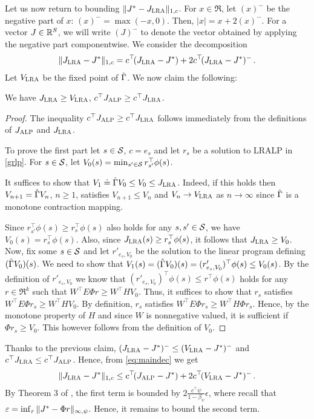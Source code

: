 \documentclass[twocolumn]{IEEEtran}
\begin{document}
Let us now return to bounding $\norm{J^*-\Jlr}_{1,c}$.
For $x\in \Re$, let $(x)^-$ be the negative part of $x$: $(x)^- = \max(-x,0)$. Then, $|x| = x + 2 (x)^-$. For a vector $J\in \R^S$,
we will write $(J)^-$ to denote the vector obtained by applying the negative part componentwise.
We consider the decomposition
\begin{align}
\label{eq:maindec}
\norm{\Jlr-J^*}_{1,c} = c^\top\!( \Jlr - J^* ) + 2c^\top\!( \Jlr - J^* )^-\,.
\end{align}
Let $\hv$ be the fixed point of $\hg$. We now claim the following:
\begin{claim}
We have $\Jlr \ge \hv$, $c^\top \Jalp \ge c^\top \Jlr$.
\end{claim}
\begin{proof}
The inequality $c^\top \Jalp \ge c^\top \Jlr$  follows immediately from the definitions of $\Jalp$ and $\Jlr$.

To prove the first part let $s\in \S$,  $c=e_s$ and let $r_s$ be a solution to LRALP in \eqref{grlp}.
For $s\in \S$, let $V_0(s)= \min_{s'\in \S} r_{s'}^\top \phi(s)$.

It suffices to show that $V_1\eqdef \hg V_0 \le V_0 \le \hj$.
Indeed, if this holds then
$V_{n+1} = \hg V_n$, $n\ge 1$, satisfies $V_{n+1}\le V_n$ and $V_n \to \hv$ as $n\to\infty$
since $\hg$ is a monotone contraction mapping.


Since  $r_{s'}^\top \phi(s) \ge r_s^\top \phi(s)$ %
also holds for any $s,s'\in \S$,
we have $V_0(s)  = r_s^\top \phi(s)$. %
Also, since $\hj(s) \ge r_s^\top \phi(s)$, %
it follows that $\hj\geq V_0$.
Now,  fix some $s\in \S$ and
let $r'_{e_s,V_0}$ be the solution to the linear program defining $(\hg V_0)(s)$.
We need to show that $V_1(s)=(\hg V_0)(s) = ( r'_{e_s,V_0})^\top \phi(s) \leq V_0(s)$.
By the definition of $r'_{e_s,V_0}$ we know that $( r'_{e_s,V_0})^\top \phi(s) \le r^\top \phi(s)$ %
holds for any $r\in \Re^k$ such that $W^\top E \Phi r \ge W^\top H V_0$.
Thus, it suffices to show that $r_s$ satisfies $W^\top E \Phi r_s \ge W^\top H V_0$.
By definition, $r_s$ satisfies $W^\top E \Phi r_s \ge W^\top H \Phi r_s$.
Hence, by the monotone property of $H$ and since $W$ is nonnegative valued, %
it is sufficient if $\Phi r_s \ge V_0$.
This however follows from the definition of $V_0$.
\end{proof}
Thanks to the previous claim, $(\Jlr - J^*)^- \le (\hv - J^*)^-$ and $c^\top \Jlr \le c^\top \Jalp$. Hence,
from \eqref{eq:maindec} we get
\begin{align*}
\norm{\Jlr-J^*}_{1,c} \le c^\top\!( \Jalp - J^* ) + 2c^\top\!( \hv - J^* )^-\,.
\end{align*}
By Theorem 3 of \cite{ALP}, the first term is bounded by $2 \frac{c^\top \psi}{1-\beta_\psi} \epsilon$, where
recall that $\epsilon = \inf_{r} \norm{J^* - \Phi r}_{\mn}$. Hence, it remains to bound the second term.
\end{document}
